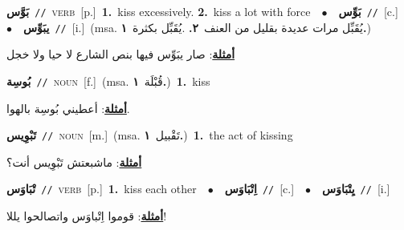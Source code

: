 \documentclass[10pt,a4paper,twoside]{article} %
\begin{document}
\begin{multicols}{2}
{\setlength\topsep{0pt}\textbf{\foreignlanguage{arabic}{بَوَّس}}\ {\color{gray}\texttt{//}\color{black}}\ \textsc{verb}\ [p.]\ \textbf{1.}~kiss excessively.  \textbf{2.}~kiss a lot with force\ \ $\bullet$\ \ \setlength\topsep{0pt}\textbf{\foreignlanguage{arabic}{بَوِّس}}\ {\color{gray}\texttt{//}\color{black}}\ [c.]\ \ $\bullet$\ \ \setlength\topsep{0pt}\textbf{\foreignlanguage{arabic}{يبَوِّس}}\ {\color{gray}\texttt{//}\color{black}}\ [i.]\ \color{gray}(msa. \foreignlanguage{arabic}{يُقَبِّل مرات عديدة بقليل من العنف}~\foreignlanguage{arabic}{\textbf{٢.}}  .\foreignlanguage{arabic}{يُقَبِّل بكثرة}~\foreignlanguage{arabic}{\textbf{١.}})\color{black}\  \begin{flushright}\color{gray}\foreignlanguage{arabic}{\textbf{\underline{\foreignlanguage{arabic}{أمثلة}}}: صار يبَوِّس فيها بنص الشارع لا حيا ولا خجل}\end{flushright}\color{black}} \vspace{2mm}

{\setlength\topsep{0pt}\textbf{\foreignlanguage{arabic}{بُوسِة}}\ {\color{gray}\texttt{//}\color{black}}\ \textsc{noun}\ [f.]\ \color{gray}(msa. \foreignlanguage{arabic}{قُبْلَة}~\foreignlanguage{arabic}{\textbf{١.}})\color{black}\ \textbf{1.}~kiss\  \begin{flushright}\color{gray}\foreignlanguage{arabic}{\textbf{\underline{\foreignlanguage{arabic}{أمثلة}}}: أعطيني بُوسِة بالهوا.}\end{flushright}\color{black}} \vspace{2mm}

{\setlength\topsep{0pt}\textbf{\foreignlanguage{arabic}{تَبْوِيس}}\ {\color{gray}\texttt{//}\color{black}}\ \textsc{noun}\ [m.]\ \color{gray}(msa. \foreignlanguage{arabic}{تَقْبيل}~\foreignlanguage{arabic}{\textbf{١.}})\color{black}\ \textbf{1.}~the act of kissing\  \begin{flushright}\color{gray}\foreignlanguage{arabic}{\textbf{\underline{\foreignlanguage{arabic}{أمثلة}}}: ماشبعتش تَبْوِيس أنت؟}\end{flushright}\color{black}} \vspace{2mm}

{\setlength\topsep{0pt}\textbf{\foreignlanguage{arabic}{تْبَاوَس}}\ {\color{gray}\texttt{//}\color{black}}\ \textsc{verb}\ [p.]\ \textbf{1.}~kiss each other\ \ $\bullet$\ \ \setlength\topsep{0pt}\textbf{\foreignlanguage{arabic}{اِتْبَاوَس}}\ {\color{gray}\texttt{//}\color{black}}\ [c.]\ \ $\bullet$\ \ \setlength\topsep{0pt}\textbf{\foreignlanguage{arabic}{يِتْبَاوَس}}\ {\color{gray}\texttt{//}\color{black}}\ [i.]\  \begin{flushright}\color{gray}\foreignlanguage{arabic}{\textbf{\underline{\foreignlanguage{arabic}{أمثلة}}}: قوموا اِتْباوَس واتصالحوا يللا!}\end{flushright}\color{black}} \vspace{2mm}


\end{multicols}
\end{document}

